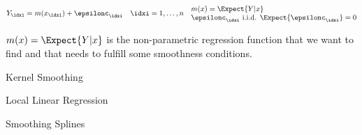 \begin{defnbox}\nospacing
    \begin{defn}\label{defn:nonparametric_regression}
        \begin{align}
          Y_{\idxi}=m(x_{\idxi})+\epsilonc_{\idxi}&&\idxi=1,\ldots,n&&
          \begin{aligned}
              &m(x)=\Expect{Y|x}\\[-1\jot]
              &\epsilonc_{\idxi}\text{ i.i.d. }\Expect{\epsilonc_{\idxi}}=0
          \end{aligned}\label{eq:nonparametric_regression}
        \end{align}
    \end{defn}
\end{defnbox}
\begin{corbox}\nospacing
    \begin{cor}\label{cor:nonparametric_regression_function}
        $m(x)=\Expect{Y|x}$ is the non-parametric regression function that we want to find and that needs to fulfill some smoothness conditions.
    \end{cor}
\end{corbox}
\begin{sectionbox}\nospacing
    \begin{circlelistnosep}
        \item Kernel Smoothing
        \item Local Linear Regression
        \item Smoothing Splines
    \end{circlelistnosep}
\end{sectionbox}
